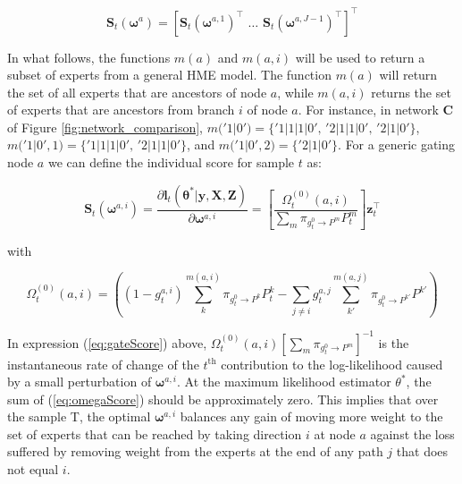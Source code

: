 \documentclass[12pt]{article}
\newcommand{\bw}[1]{\boldsymbol{\omega}^{#1}}
\newcommand{\gateprod}[2]{\pi_{#1 \longrightarrow #2}}
\newcommand{\FnOmegaNaught}[2]{\Omega^{(0)}_{t}( #1, #2 )}
\begin{document}
\begin{equation}
  \boldsymbol{S}_{t}(\boldsymbol{\omega}^{a}) = [ \boldsymbol{S}_{t}(\bw{a, 1})^{\top} \,\, \ldots \,\, \boldsymbol{S}_{t}(\bw{a, J - 1})^{\top} ]^{\top}
\end{equation}

In what follows, the functions $m(a)$ and $m(a, i)$ will be used to return
a subset of experts from a general HME model. The function $m(a)$ will
return the set of all experts that are ancestors of node $a$, while
$m(a, i)$ returns the set of experts that are ancestors from branch
$i$ of node $a$. For instance, in network $\boldsymbol{C}$ of Figure
\ref{fig:network_comparison}, $m('1|0') = \{'1|1|1|0', \, '2|1|1|0', \, '2|1|0'\}$,
$m('1|0', 1) = \{'1|1|1|0', \, '2|1|1|0'\}$, and $m('1|0', 2) = \{'2|1|0'\}$.
For a generic gating node $a$ we can define the individual score for 
sample $t$ as:

\begin{equation} \label{eq:gateScore}
  \boldsymbol{S}_{t}(\bw{a, i}) = \frac{\partial \boldsymbol{l}_{t}(\boldsymbol{\theta}^{*}| \boldsymbol{y}, \boldsymbol{X}, \boldsymbol{Z}) }{\partial \boldsymbol{\omega}^{a,i}} = \left[ \frac{ \FnOmegaNaught{a}{i} }{ \sum_{m} \gateprod{g^{0}_{t}}{P^{m} } P^{m}_{t} } \right] \boldsymbol{z}_{t}^{\top} 
\end{equation}

with

\begin{equation} \label{eq:omegaScore}
  \FnOmegaNaught{a}{i} = \left( (1 - g^{a, i}_{t}) \sum_{k}^{m(a, i)} \gateprod{g^{0}_{t}}{P^{k}} P^{k}_{t} - \sum_{j \neq i} g^{a,j}_{t} \sum_{k'}^{m(a, j)} \gateprod{g^{0}_{t}}{P^{k'}}  P^{k'} \right)
\end{equation}

In expression (\ref{eq:gateScore}) above, $ \FnOmegaNaught{a}{i} \left[ \sum_{m} \gateprod{g^{0}_{t}}{P^{m}} \right]^{-1}$
is the instantaneous rate of change of the $t^{\mathrm{th}}$ contribution to
the log-likelihood caused by a small perturbation of $\bw{a, i}$.
At the maximum likelihood estimator $ \theta^{*}$, the sum
of (\ref{eq:omegaScore}) should be approximately zero.
This implies that over the sample T, the optimal $\bw{a, i}$
balances any gain of moving more weight to the set of experts that can be
reached by taking direction $i$ at node $a$ against the loss suffered by 
removing weight from the experts at the end of any path $j$ that does not 
equal $i$.

\bigskip
\end{document}
